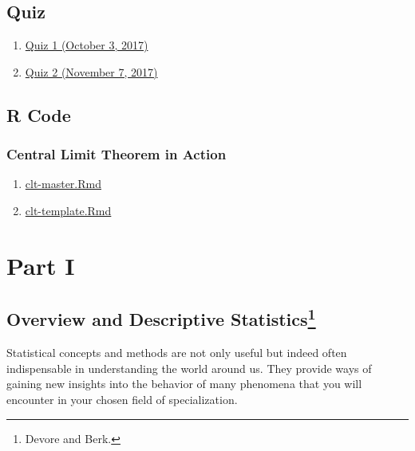 \documentclass[]{book}
\providecommand{\tightlist}{%
  \setlength{\itemsep}{0pt}\setlength{\parskip}{0pt}}
\let\rmarkdownfootnote\footnote%
\def\footnote{\protect\rmarkdownfootnote}
\theoremstyle{definition}
\theoremstyle{definition}
\theoremstyle{definition}
\theoremstyle{remark}
\begin{document}
\chapter*{Quiz}\label{quiz}

\begin{enumerate}
\def\labelenumi{\arabic{enumi}.}
\tightlist
\item
  \href{https://github.com/sahirbhatnagar/MATH697/blob/master/images/quiz-1-F2017.pdf}{Quiz
  1 (October 3, 2017)}
\item
  \href{https://github.com/sahirbhatnagar/MATH697/blob/master/images/quiz-2-F2017.pdf}{Quiz
  2 (November 7, 2017)}
\end{enumerate}

\chapter*{R Code}\label{r-code}

\section{Central Limit Theorem in
Action}\label{central-limit-theorem-in-action}

\begin{enumerate}
\def\labelenumi{\arabic{enumi}.}
\tightlist
\item
  \href{https://github.com/sahirbhatnagar/MATH697/blob/master/images/clt-master.Rmd}{clt-master.Rmd}\\
\item
  \href{https://github.com/sahirbhatnagar/MATH697/blob/master/images/clt-template.Rmd}{clt-template.Rmd}
\end{enumerate}

\part{Part I}\label{part-part-i}

\chapter[Overview and Descriptive Statistics]{\texorpdfstring{Overview
and Descriptive Statistics\footnote{Devore and Berk.}}{Overview and Descriptive Statistics}}\label{intro}

Statistical concepts and methods are not only useful but indeed often
indispensable in understanding the world around us. They provide ways of
gaining new insights into the behavior of many phenomena that you will
encounter in your chosen field of specialization.
\end{document}
